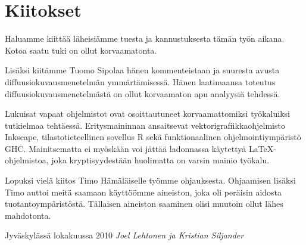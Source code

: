 
\chapter*{Kiitokset}

Haluamme kiittää läheisiämme tuesta ja kannustuksesta tämän työn
aikana. Kotoa saatu tuki on ollut korvaamatonta.

Lisäksi kiitämme Tuomo Sipolaa hänen kommenteistaan ja suuresta avusta
diffuusiokuvausmenetelmän ymmärtämisessä. Hänen laatimaansa
toteutus diffuusiokuvausmenetelmästä on ollut korvaamaton apu
analyysiä tehdessä.

Lukuisat vapaat ohjelmistot ovat osoittautuneet korvaamattomiksi
työkaluiksi tutkielmaa tehtäessä. Eritysmaininnan ansaitsevat
vektorigrafiikkaohjelmisto Inkscape, tilastotieteellinen sovellus R
sekä funktionaalinen ohjelmointiympäristö GHC. Mainitsematta ei
myöskään voi jättää ladonnassa käytettyä \LaTeX-ohjelmistoa,
joka kryptisyydestään huolimatta on varsin mainio työkalu.

Lopuksi vielä kiitos Timo Hämäläiselle työmme ohjauksesta. Ohjaamisen
lisäksi Timo auttoi meitä saamaan käyttöömme aineiston, joka oli
peräisin aidosta tuotantoympäristöstä. Tällaisen aineiston saaminen
olisi muutoin ollut lähes mahdotonta.

\vskip 1cm
Jyväskylässä lokakuussa 2010
\vskip 0.5cm
\textit{Joel Lehtonen ja Kristian Siljander}
